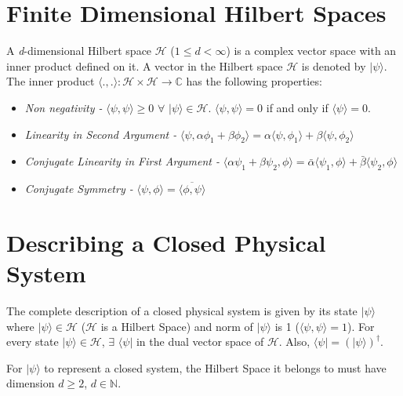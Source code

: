 \documentclass{article}
\begin{document}
\section{Finite Dimensional Hilbert Spaces}
A \textit{d}-dimensional Hilbert space $\mathcal{H}$ ($1 \leq d < \infty$) is a complex vector space with an inner product defined on it. A vector in the Hilbert space $\mathcal{H}$ is denoted by $|\psi\rangle $. The inner product $\langle . ,. \rangle : \mathcal{H} \times \mathcal{H} \rightarrow \mathbb{C} $ has the following properties:
\begin{itemize}
	\item \textit{Non negativity -} $\langle \psi , \psi \rangle \geq 0$ $\forall$ $|\psi \rangle \in \mathcal{H}$. $\langle \psi , \psi \rangle = 0$ if and only if $\langle \psi \rangle= 0$.
	      
	\item \textit{Linearity in Second Argument -} $\langle \psi , \alpha \phi_1 + \beta \phi_2 \rangle = \alpha \langle \psi , \phi_1 \rangle + \beta \langle \psi , \phi_2 \rangle $
	      
	\item \textit{Conjugate Linearity in First Argument -} $\langle \alpha \psi_1 + \beta \psi_2 , \phi \rangle = \bar{\alpha} \langle \psi_1 , \phi \rangle + \bar{\beta} \langle \psi_2 , \phi \rangle$
	      
	\item \textit{Conjugate Symmetry -} $\langle \psi , \phi \rangle = \overline{\langle \phi , \psi \rangle}$
\end{itemize}

\section{Describing a Closed Physical System}
The complete description of a closed physical system is given by its state $ | \psi \rangle $ where $ | \psi \rangle \in \mathcal{H}$ ($\mathcal{H}$ is a Hilbert Space) and norm of $ | \psi \rangle $ is 1 ($\langle \psi , \psi \rangle = 1$).
For every state $ | \psi \rangle \in \mathcal{H}$, $\exists$ $\langle \psi |$ in the dual vector space of $\mathcal{H}$. Also, $\langle \psi | = (| \psi \rangle)^{\dagger}$.

For $| \psi \rangle$ to represent a closed system, the Hilbert Space it belongs to must have dimension $d \geq 2$, $d \in \mathbb{N}$.
\end{document}
